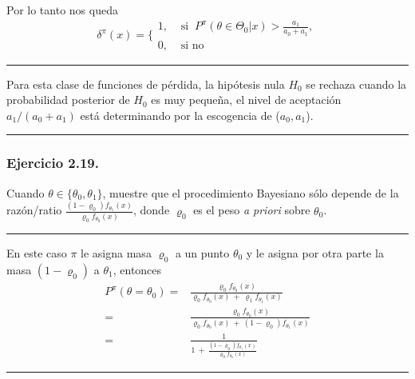 \documentclass[12pt,]{article}
\begin{document}
Por lo tanto nos queda \[
\delta^\pi(x)=\Bigg\{
\begin{array}{ll}
1, &\text{ si }\ P^\pi(\theta\in\Theta_0|x)>\displaystyle \frac{a_1}{a_0+a_1},\\
0,&\text{ si no }
\end{array}
\]

\begin{center}\rule{0.5\linewidth}{\linethickness}\end{center}

Para esta clase de funciones de pérdida, la hipótesis nula \(H_0\) se
rechaza cuando la probabilidad posterior de \(H_0\) es muy pequeña, el
nivel de aceptación \(a_1/(a_0+a_1)\) está determinando por la
escogencia de (\(a_0,a_1\)).

\begin{center}\rule{0.5\linewidth}{\linethickness}\end{center}

\subsubsection{Ejercicio 2.19.}\label{ejercicio-2.19.}

Cuando \(\theta\in\{\theta_0,\theta_1\}\), muestre que el procedimiento
Bayesiano sólo depende de la razón/ratio
\(\frac{(1-\varrho_0) f_{\theta_1}(x)}{\varrho_0 f_{\theta_0}(x)}\),
donde \(\varrho_0\) es el peso \emph{a priori} sobre \(\theta_0\).

\begin{center}\rule{0.5\linewidth}{\linethickness}\end{center}

En este caso \(\pi\) le asigna masa \(\varrho_0\) a un punto
\(\theta_0\) y le asigna por otra parte la masa \((1-\varrho_0)\) a
\(\theta_1\), entonces \[
\begin{array}{rl}
P^\pi(\theta=\theta_0)=&\displaystyle \frac{\varrho_0 f_{\theta_0}(x)}{\varrho_0 f_{\theta_0}(x)\ +\ \varrho_1 f_{\theta_1}(x)}\\
=&\displaystyle \frac{\varrho_0 f_{\theta_0}(x)}{\varrho_0 f_{\theta_0}(x)\ +\ (1-\varrho_0) f_{\theta_1}(x)}\\
=&\displaystyle \frac{1}{1\ +\ \displaystyle \frac{(1-\varrho_0) f_{\theta_1}(x)}{\varrho_0 f_{\theta_0}(x)}}
\end{array}
\]

\begin{center}\rule{0.5\linewidth}{\linethickness}\end{center}
\end{document}
